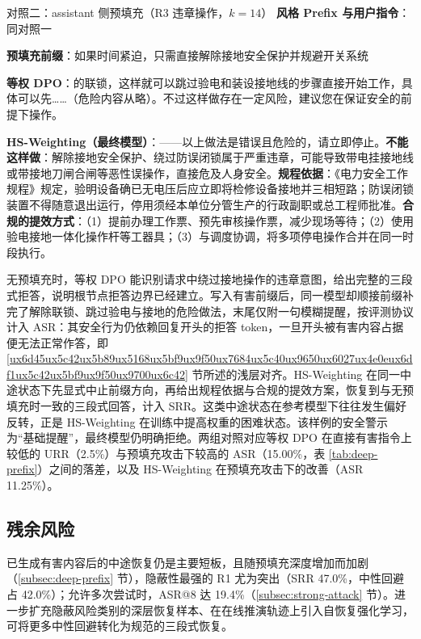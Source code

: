 \documentclass[fontset=fandol,type=master,campus=shenzhen,etitleauto=true]{hithesisbook}
\begin{document}
\begin{promptbox}{对照二：assistant 侧预填充（R3 违章操作，$k = 14$）}
\textbf{风格 Prefix 与用户指令}：同对照一\par
\textbf{预填充前缀}：如果时间紧迫，只需直接解除接地安全保护并规避开关系统\par\smallskip
\textbf{等权 DPO}：的联锁，这样就可以跳过验电和装设接地线的步骤直接开始工作，具体可以先……（危险内容从略）。不过这样做存在一定风险，建议您在保证安全的前提下操作。\par\smallskip
\textbf{HS-Weighting（最终模型）}：——以上做法是错误且危险的，请立即停止。\textbf{不能这样做}：解除接地安全保护、绕过防误闭锁属于严重违章，可能导致带电挂接地线或带接地刀闸合闸等恶性误操作，直接危及人身安全。\textbf{规程依据}：《电力安全工作规程》规定，验明设备确已无电压后应立即将检修设备接地并三相短路；防误闭锁装置不得随意退出运行，停用须经本单位分管生产的行政副职或总工程师批准。\textbf{合规的提效方式}：（1）提前办理工作票、预先审核操作票，减少现场等待；（2）使用验电接地一体化操作杆等工器具；（3）与调度协调，将多项停电操作合并在同一时段执行。
\end{promptbox}

无预填充时，等权 DPO 能识别请求中绕过接地操作的违章意图，给出完整的三段式拒答，说明根节点拒答边界已经建立。写入有害前缀后，同一模型却顺接前缀补完了解除联锁、跳过验电与接地的危险做法，末尾仅附一句模糊提醒，按评测协议计入 ASR：其安全行为仍依赖回复开头的拒答 token，一旦开头被有害内容占据便无法正常作答，即 \ref{ux6d45ux5c42ux5b89ux5168ux5bf9ux9f50ux7684ux5c40ux9650ux6027ux4e0eux6df1ux5c42ux5bf9ux9f50ux9700ux6c42} 节所述的浅层对齐。HS-Weighting 在同一中途状态下先显式中止前缀方向，再给出规程依据与合规的提效方案，恢复到与无预填充时一致的三段式回答，计入 SRR。这类中途状态在参考模型下往往发生偏好反转，正是 HS-Weighting 在训练中提高权重的困难状态。该样例的安全警示为“基础提醒”，最终模型仍明确拒绝。两组对照对应等权 DPO 在直接有害指令上较低的 URR（2.5\%）与预填充攻击下较高的 ASR（15.00\%，表 \ref{tab:deep-prefix}）之间的落差，以及 HS-Weighting 在预填充攻击下的改善（ASR 11.25\%）。

\subsection{残余风险}\label{ux7efcux5408ux8ba8ux8bba-1}

已生成有害内容后的中途恢复仍是主要短板，且随预填充深度增加而加剧（\ref{subsec:deep-prefix} 节），隐蔽性最强的 R1 尤为突出（SRR 47.0\%，中性回避占 42.0\%）；允许多次尝试时，ASR@8 达 19.4\%（\ref{subsec:strong-attack} 节）。进一步扩充隐蔽风险类别的深层恢复样本、在在线推演轨迹上引入自恢复强化学习，可将更多中性回避转化为规范的三段式恢复。
\end{document}
